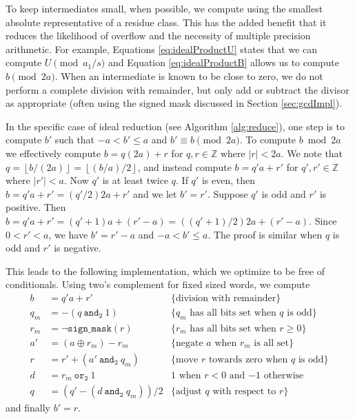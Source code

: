 \documentclass{ucalgthes1}
\theoremstyle{definition}
\newcommand{\ZZ}{\mathbb{Z}}
\newcommand{\floor}[1]{\left\lfloor #1 \right\rfloor}
\newcommand{\band}{~\texttt{and}_\texttt{2}~}
\newcommand{\bor}{~\texttt{or}_\texttt{2}~}
\newcommand{\bxor}{\oplus}
\newcommand{\bnot}{\lnot}
\begin{document}
To keep intermediates small, when possible, we compute using the smallest absolute representative of a residue class.  This has the added benefit that it reduces the likelihood of overflow and the necessity of multiple precision arithmetic.  For example, Equations \ref{eq:idealProductU} states that we can compute $U \pmod {a_1/s}$ and Equation \ref{eq:idealProductB} allows us to compute $b \pmod{2a}$.  When an intermediate is known to be close to zero, we do not perform a complete division with remainder, but only add or subtract the divisor as appropriate (often using the signed mask discussed in Section \ref{sec:gcdImpl}).

In the specific case of ideal reduction (see Algorithm \ref{alg:reduce}), one step is to compute $b'$ such that $-a < b' \le a$ and $b' \equiv b \pmod{2a}$.  To compute $b \bmod{2a}$ we effectively compute $b = q(2a) + r$ for $q, r \in \ZZ$ where $|r| < 2a$.  We note that $q = \floor{b/(2a)} = \floor{(b/a)/2}$, and instead compute $b = q'a+r'$ for $q', r' \in \ZZ$ where $|r'| < a$.  Now $q'$ is at least twice $q$.  If $q'$ is even, then $b = q'a + r' = (q'/2)2a + r'$ and we let $b' = r'$. Suppose $q'$ is odd and $r'$ is positive.  Then $b = q'a + r' = (q' + 1)a + (r' - a) = ((q' + 1)/2)2a + (r' - a)$.  Since $0 < r' < a$, we have $b' = r' - a$ and $-a < b' \le a$.  The proof is similar when $q$ is odd and $r'$ is negative.

This leads to the following implementation, which we optimize to be free of conditionals.  Using two's complement for fixed sized words, we compute 
\begin{align*}
b   &= q'a + r' & \textrm{\{division with remainder\}}\\
q_m &= -(q \band 1) & \textrm{\{$q_m$ has all bits set when $q$ is odd\}} \\
r_m &= \bnot\texttt{sign\_mask}(r) & \textrm{\{$r_m$ has all bits set when $r \ge 0$\}} \\
a'  &= (a \bxor r_m) - r_m & \textrm{\{negate $a$ when $r_m$ is all set\}} \\
r   &= r' + (a' \band q_m) & \textrm{\{move $r$ towards zero when $q$ is odd\}} \\
d   &= r_m \bor 1 & \textrm{1 when $r < 0$ and $-1$ otherwise} \\
q   &= (q' - (d \band q_m))/2 & \textrm{\{adjust $q$ with respect to $r$\}}
\end{align*}
and finally $b' = r$.
\end{document}
